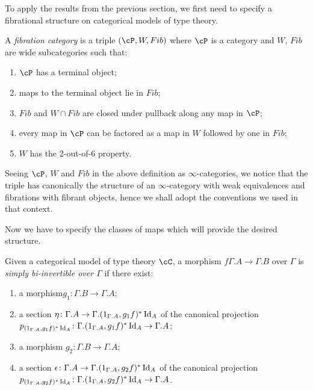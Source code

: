 \documentclass[a4paper,fontsize=12pt]{scrartcl}
\begin{document}
To apply the results from the previous section, we first need to specify a
fibrational structure on categorical models of type theory.

\begin{defn}
  A \emph{fibration category} is a triple $(\cP,W,Fib)$ where $\cP$ is a
  category and $W$, $Fib$ are wide subcategories such that:
  \begin{enumerate}
    \item $\cP$ has a terminal object;
    \item maps to the terminal object lie in $Fib$;
    \item $Fib$ and $W\cap Fib$ are closed under pullback along any map in $\cP$;
    \item every map in $\cP$ can be factored as a map in $W$ followed by one in
      $Fib$;
    \item $W$ has the 2-out-of-6 property.
  \end{enumerate}
\end{defn}

\begin{rmk}
  Seeing $\cP$, $W$ and $Fib$ in the above definition as $\infty$-categories, we
  notice that the triple has canonically the structure of an $\infty$-category
  with weak equivalences and fibrations with fibrant objects, hence we shall
  adopt the conventions we used in that context.
\end{rmk}

Now we have to specify the classes of maps which will provide the desired
structure.

\begin{defn}
  Given a categorical model of type theory $\cC$, a morphism
  $f\Gamma.A\rightarrow\Gamma.B$ over $\Gamma$ is \emph{simply bi-invertible
  over $\Gamma$} if there exist:
  \begin{enumerate}
    \item a morphism$g_1\colon\Gamma.B\rightarrow\Gamma.A$;
    \item a section $\eta\colon\Gamma.A\rightarrow\Gamma.(1_{\Gamma.A},g_1f)^*\operatorname{Id}_{A}$
      of the canonical projection
      $p_{(1_{\Gamma.A},g_1f)^*\operatorname{Id}_{A}}\colon
      \Gamma.(1_{\Gamma.A},g_1f)^*\operatorname{Id}_{A}\rightarrow\Gamma.A$;
    \item a morphism $g_2\colon\Gamma.B\rightarrow\Gamma.A$;
    \item a section $\epsilon\colon\Gamma.A\rightarrow\Gamma.(1_{\Gamma.A},g_2f)^*\operatorname{Id}_{A}$
      of the canonical projection
      $p_{(1_{\Gamma.A},g_2f)^*\operatorname{Id}_{A}}\colon
      \Gamma.(1_{\Gamma.A},g_2f)^*\operatorname{Id}_{A}\rightarrow\Gamma.A$.
  \end{enumerate}
\end{defn}
\end{document}
